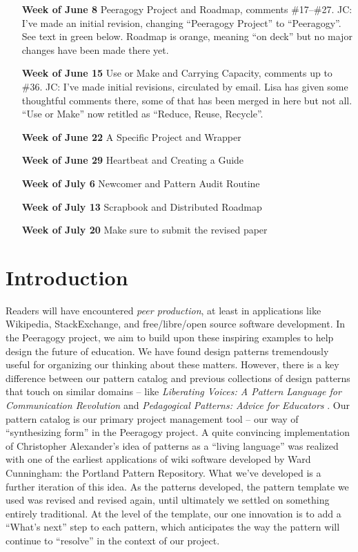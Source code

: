 \begin{itemize}
\item[{\bf Week of June 8}] Peeragogy Project and Roadmap, comments \#17--\#27.  JC: I've made an initial revision, changing ``Peeragogy Project'' to ``Peeragogy''.  See text in green below.  Roadmap is orange, meaning ``on deck'' but no major changes have been made there yet.
\item[{\bf Week of June 15}] Use or Make and Carrying Capacity, comments up to \#36.  JC: I've made initial revisions, circulated by email.  Lisa has given some thoughtful comments there, some of that has been merged in here but not all. ``Use or Make'' now retitled as ``Reduce, Reuse, Recycle''.
\item[{\bf Week of June 22}] A Specific Project and Wrapper
\item[{\bf Week of June 29}] Heartbeat and Creating a Guide
\item[{\bf Week of July 6}] Newcomer and Pattern Audit Routine
\item[{\bf Week of July 13}] Scrapbook and Distributed Roadmap
\item[{\bf Week of July 20}] Make sure to submit the revised paper
\end{itemize}

\section{Introduction}\label{sec:Introduction}

Readers will have encountered \emph{peer production}, at least in applications like Wikipedia, StackExchange, and free/libre/open source software development.   In the Peeragogy project,  we aim to build upon these inspiring examples to help design the future of education.  
We have found design patterns tremendously useful for organizing our thinking about these matters.  However, there is a key difference between our pattern catalog and previous collections of design patterns that touch on similar domains -- like \emph{Liberating Voices: A Pattern Language for Communication Revolution} \cite{schuler2008liberating} and \emph{Pedagogical Patterns: Advice for Educators} \cite{bergin2012pedagogical}.  Our pattern catalog is our primary project management tool -- our way of ``synthesizing form'' \cite{alexander1964notes} in the Peeragogy project. A quite convincing implementation of Christopher Alexander’s idea of patterns as a ``living language'' \cite[p.~xvii]{alexander1977pattern} was realized with one of the earliest applications of wiki software developed by Ward Cunningham: the Portland Pattern Repository.  What we've developed is a further iteration of this idea.   As the patterns developed, the pattern template we used was revised and revised again, until ultimately we settled on something entirely traditional.  At the level of the template, our one innovation is to add a ``What's next'' step to each pattern, which anticipates the way the pattern will continue to ``resolve'' in the context of our project. 

